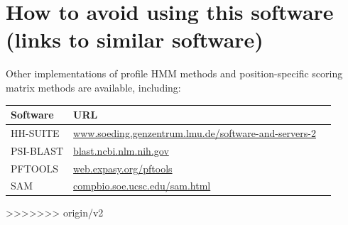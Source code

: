 \section{How to avoid using this software (links to similar software)}

Other implementations of profile HMM methods and position-specific
scoring matrix methods are available, including:

\begin{center}
\begin{tabular}{lp{5in}l}
Software  &   URL \\ \hline
HH-SUITE  & \href{http://www.soeding.genzentrum.lmu.de/software-and-servers-2/}{www.soeding.genzentrum.lmu.de/software-and-servers-2}\\
PSI-BLAST & \href{https://blast.ncbi.nlm.nih.gov/}{blast.ncbi.nlm.nih.gov}\\
PFTOOLS   & \href{http://web.expasy.org/pftools/}{web.expasy.org/pftools}\\
SAM       & \href{https://compbio.soe.ucsc.edu/sam.html}{compbio.soe.ucsc.edu/sam.html}\\
\end{tabular}
\end{center}





  









>>>>>>> origin/v2
